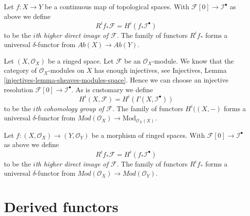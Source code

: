 \medskip\noindent
Let $f : X \to Y$ be a continuous map of topological spaces. With
$\mathcal{F}[0] \to \mathcal{I}^\bullet$ as above
we define
\begin{equation}
\label{equation-higher-direct-image}
R^if_*\mathcal{F} = H^i(f_*\mathcal{I}^\bullet)
\end{equation}
to be the {\it $i$th higher direct image of $\mathcal{F}$}.
The family of functors $R^if_*$ forms a universal $\delta$-functor
from $\textit{Ab}(X) \to \textit{Ab}(Y)$.

\medskip\noindent
Let $(X, \mathcal{O}_X)$ be a ringed space. Let $\mathcal{F}$ be an
$\mathcal{O}_X$-module. We know that the category of $\mathcal{O}_X$-modules
on $X$ has enough injectives, see
Injectives, Lemma \ref{injectives-lemma-sheaves-modules-space}.
Hence we can choose an injective resolution
$\mathcal{F}[0] \to \mathcal{I}^\bullet$. As is customary we define
\begin{equation}
\label{equation-cohomology-modules}
H^i(X, \mathcal{F}) = H^i(\Gamma(X, \mathcal{I}^\bullet))
\end{equation}
to be the {\it $i$th cohomology group of $\mathcal{F}$}.
The family of functors $H^i((X, -)$ forms a universal $\delta$-functor
from $\textit{Mod}(\mathcal{O}_X) \to \text{Mod}_{\mathcal{O}_X(X)}$.

\medskip\noindent
Let $f : (X, \mathcal{O}_X) \to (Y, \mathcal{O}_Y)$ be a morphism of ringed
spaces. With $\mathcal{F}[0] \to \mathcal{I}^\bullet$ as above
we define
\begin{equation}
\label{equation-higher-direct-image-modules}
R^if_*\mathcal{F} = H^i(f_*\mathcal{I}^\bullet)
\end{equation}
to be the {\it $i$th higher direct image of $\mathcal{F}$}.
The family of functors $R^if_*$ forms a universal $\delta$-functor
from $\textit{Mod}(\mathcal{O}_X) \to \textit{Mod}(\mathcal{O}_Y)$.





\section{Derived functors}
\label{section-derived-functors}


